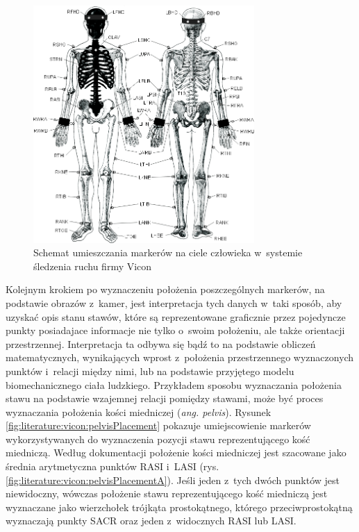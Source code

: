 \begin{savenotes}
	\begin{figure}[!htp]
		\centering	
		\includegraphics[width=0.75\textwidth]{images/markerPlacement.jpg}
		\caption[Rysunek przedstawiający schemat umieszczania markerów na ciele człowieka w~systemie śledzenia ruchu firmy Vicon]{Schemat umieszczania markerów na ciele człowieka w~systemie śledzenia ruchu firmy Vicon\cite{ViconGaitPlacement}}
		\label{fig:literature:vicon:markerPlacement}
	\end{figure}
\end{savenotes}
																			
Kolejnym krokiem po wyznaczeniu położenia poszczególnych markerów, na podstawie obrazów z~kamer, jest interpretacja tych danych w~taki sposób, aby uzyskać opis stanu stawów, które są reprezentowane graficznie przez pojedyncze punkty posiadajace informacje nie tylko o~swoim położeniu, ale także orientacji przestrzennej. Interpretacja ta odbywa się bądź to na podstawie obliczeń matematycznych, wynikających wprost z~położenia przestrzennego wyznaczonych punktów i~relacji między nimi, lub na podstawie przyjętego modelu biomechanicznego ciała ludzkiego. 
Przykładem sposobu wyznaczania położenia stawu na podstawie wzajemnej relacji pomiędzy stawami, może być proces wyznaczania położenia kości miedniczej (\emph{ang. pelvis}). Rysunek \ref{fig:literature:vicon:pelvisPlacement} pokazuje umiejscowienie markerów wykorzystywanych do wyznaczenia pozycji stawu reprezentującego kość miedniczą. Według dokumentacji \cite{ViconModelingInstruction} położenie kości miedniczej jest szacowane jako średnia arytmetyczna punktów RASI i~LASI (rys. \ref{fig:literature:vicon:pelvisPlacementA}). Jeśli jeden z~tych dwóch punktów jest niewidoczny, wówczas położenie stawu reprezentującego kość miedniczą jest wyznaczane jako wierzchołek trójkąta prostokątnego, którego przeciwprostokątną wyznaczają punkty SACR oraz jeden z~widocznych RASI lub LASI.
																	
